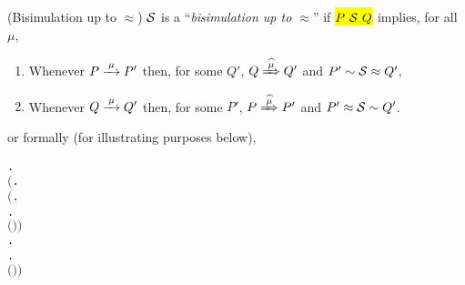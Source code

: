 \begin{definition}{(Bisimulation up to $\approx$)}
  $\S$ is a ``\emph{bisimulation up to $\approx$}'' if
  \hl{$P\ \S\ Q$} implies, for all $\mu$,
\begin{enumerate}
\item Whenever $P \arr{\mu} P'$ then, for some
  $Q'$, $Q \Arcap{\mu} Q'$ and $P' \sim \S \approx Q'$,
\item Whenever $Q \arr{\mu} Q'$ then, for some
  $P'$, $P \Arcap{\mu} P'$ and $P' \approx \S \sim Q'$.
\end{enumerate}
or formally (for illustrating purposes below),
\begin{alltt}
      \HOLSymConst{\HOLTokenDefEquality{}}
      \HOLSymConst{\HOLTokenForall{}} .
             \HOLSymConst{\HOLTokenImp{}}
          \ensuremath{(}\HOLSymConst{\HOLTokenForall{}}.
               \ensuremath{(}\HOLSymConst{\HOLTokenForall{}}.
                     \HOLTokenTransBegin{} \HOLTokenTransEnd {} \HOLSymConst{\HOLTokenImp{}}
                    \HOLSymConst{\HOLTokenExists{}}.
                         \HOLTokenWeakTransBegin{} \HOLTokenWeakTransEnd {} \HOLSymConst{\HOLTokenConj{}}
                        \ensuremath{(} \HOLSymConst{\HOLTokenRCompose{}}  \HOLSymConst{\HOLTokenRCompose{}} \ensuremath{)}  \ensuremath{)} \HOLSymConst{\HOLTokenConj{}}
               \HOLSymConst{\HOLTokenForall{}}.
                    \HOLTokenTransBegin{} \HOLTokenTransEnd {} \HOLSymConst{\HOLTokenImp{}}
                   \HOLSymConst{\HOLTokenExists{}}.
                        \HOLTokenWeakTransBegin{} \HOLTokenWeakTransEnd {} \HOLSymConst{\HOLTokenConj{}}
                       \ensuremath{(} \HOLSymConst{\HOLTokenRCompose{}}  \HOLSymConst{\HOLTokenRCompose{}} \ensuremath{)}  \ensuremath{)} \HOLSymConst{\HOLTokenConj{}}

\end{alltt}
\end{definition}
